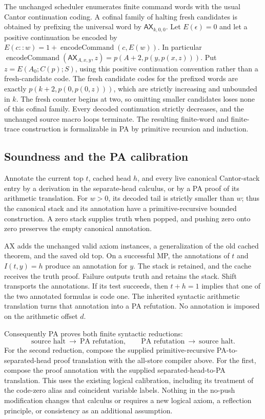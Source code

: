 The unchanged scheduler enumerates finite command words with the usual
Cantor continuation coding. A cofinal family of halting fresh candidates
is obtained by prefixing the universal word by
$\mathsf{AX}_{k,0,0}$. Let $E(\epsilon)=0$ and let a positive continuation be encoded by
$E(c::w)=1+\operatorname{encodeCommand}(c,E(w))$. In particular
$\operatorname{encodeCommand}(\mathsf{AX}_{A,x,y},z)
=p(A+2,p(y,p(x,z)))$. Put $z=E(A_0;C(p);S)$, using this positive
continuation convention rather than a fresh-candidate code. The fresh
candidate codes for the prefixed words are exactly
$p(k+2,p(0,p(0,z)))$, which are strictly increasing and
unbounded in $k$. The fresh counter begins at two, so omitting smaller
candidates loses none of this cofinal family. Every decoded continuation
strictly decreases, and the unchanged source macro loops terminate.
The resulting finite-word and finite-trace construction is formalizable
in PA by primitive recursion and induction.

\subsection{Soundness and the PA calibration}

Annotate the current top $t$, cached head $h$, and every live canonical
Cantor-stack entry by a derivation in the separate-head calculus, or by a
PA proof of its arithmetic translation. For $w>0$, its decoded tail is
strictly smaller than $w$; thus the canonical stack and its annotation
have a primitive-recursive bounded construction. A zero stack supplies
truth when popped, and pushing zero onto zero preserves the empty
canonical annotation.

AX adds the unchanged valid axiom instances, a generalization of the old
cached theorem, and the saved old top. On a successful MP, the annotations
of $t$ and $I(t,y)=h$ produce an annotation for $y$. The stack is retained,
and the cache receives the truth proof. Failure outputs truth and retains
the stack. Shift transports the annotations. If its test succeeds, then
$t+h=1$ implies that one of the two annotated formulas is code one.
The inherited syntactic arithmetic translation turns that annotation into
a PA refutation. No annotation is imposed on the arithmetic offset $d$.

Consequently PA proves both finite syntactic reductions:
\[
 \text{source halt}\ \longrightarrow\ \text{PA refutation},
 \qquad
 \text{PA refutation}\ \longrightarrow\ \text{source halt}.
\]
For the second reduction, compose the supplied primitive-recursive
PA-to-separated-head proof translation with the all-store compiler above.
For the first, compose the proof annotation with the supplied
separated-head-to-PA translation. This uses the existing logical calibration,
including its treatment of the code-zero alias and coincident variable
labels. Nothing in the no-push modification changes that calculus or
requires a new logical axiom, a reflection principle, or consistency as
an additional assumption.

